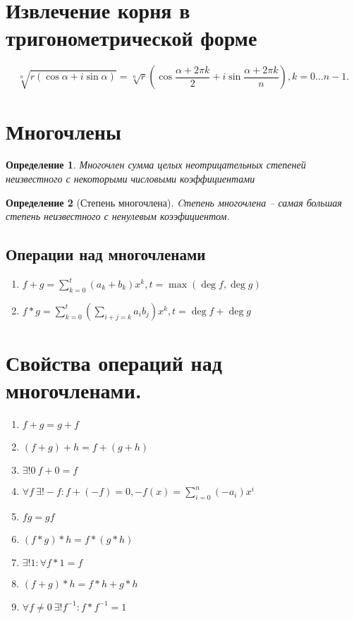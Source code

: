\documentclass{scrartcl}
\newtheorem{definition}{Определение}
\begin{document}
    \section{Извлечение корня в тригонометрической форме}
    \[
        \sqrt[n]{r( \cos{\alpha} + i\sin{\alpha} )}  =
        \sqrt[n]{r}(\cos{\frac{\alpha + 2\pi k}{2}} + i\sin{\frac{\alpha + 2\pi k}{n}}), k = 0\dots n - 1
    .\] 
    \section{Многочлены}
    \begin{definition}
        Многочлен сумма целых неотрицательных степеней неизвестного с некоторыми числовыми коэффициентами
    \end{definition}
    \begin{definition}[Степень многочлена]
        Cтепень многочлена -- самая большая степень неизвестного с ненулевым коээфициентом.
    \end{definition}
    \subsection{Операции над многочленами}
    \begin{enumerate}
        \item $f + g = \sum_{k = 0}^{t} (a_{k} + b_{k})x^{k}, t = \max(\deg{f},\deg{g})$
        \item $f * g = \sum_{k = 0}^{t} ( \sum_{i + j = k} a_{i}b_{j} )x^{k}, t = \deg{f} + \deg{g}$
    \end{enumerate}
    \section{Свойства операций над многочленами.}
    \begin{enumerate}
        \item $f + g = g + f$
        \item  $(f + g) + h = f + (g + h)$
        \item  $\exists!  0 ~ f + 0 = f$
        \item $\forall  f ~ \exists ! -f : f + (- f) = 0 , -f(x) = \sum_{i = 0}^{n}(-a_{i})x^{i}$
        \item $fg = gf$
        \item $(f * g)*h = f * (g * h)$
        \item $\exists ! 1: \forall f * 1 = f$
        \item $(f + g) * h = f*h + g*h$
        \item  $\forall f \neq 0 ~ \exists! f^{-1} : f * f^{-1} = 1$
    \end{enumerate}
\end{document}
